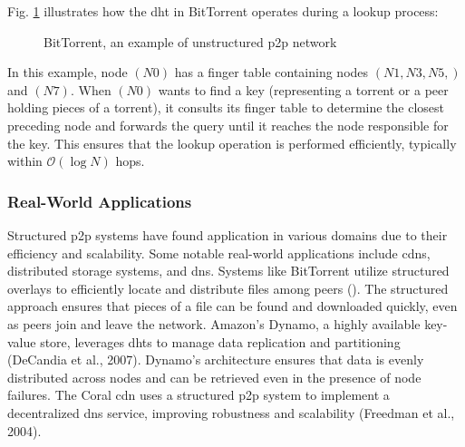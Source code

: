 Fig. \ref{fig:BitTorrent} illustrates how the \gls{dht} in BitTorrent operates during a lookup process:
\begin{figure}[htbp]
    \centering
{}
\caption{BitTorrent, an example of unstructured \gls{p2p} network}
\label{fig:BitTorrent}
\end{figure}

In this example, node $( N0 )$ has a finger table containing nodes $( N1, N3, N5, )$ and $( N7 )$.
When $( N0 )$ wants to find a key (representing a torrent or a peer holding pieces of a torrent), it consults its finger table to determine the closest preceding node and forwards the query until it reaches the node responsible for the key.
This ensures that the lookup operation is performed efficiently, typically within $\mathcal{O}(\log N)$ hops.

\subsubsection*{Real-World Applications}
Structured \gls{p2p} systems have found application in various domains due to their efficiency and scalability.
Some notable real-world applications include \glspl{cdn}, distributed storage systems, and \gls{dns}.
Systems like BitTorrent utilize structured overlays to efficiently locate and distribute files among peers (\cite{cohen2003incentives}).
The structured approach ensures that pieces of a file can be found and downloaded quickly, even as peers join and leave the network.
Amazon's Dynamo, a highly available key-value store, leverages \glspl{dht} to manage data replication and partitioning (DeCandia et al., 2007).
Dynamo's architecture ensures that data is evenly distributed across nodes and can be retrieved even in the presence of node failures.
The Coral \gls{cdn} uses a structured \gls{p2p} system to implement a decentralized \gls{dns} service, improving robustness and scalability (Freedman et al., 2004).

